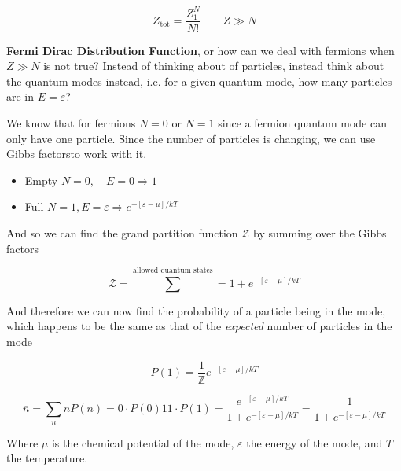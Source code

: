\documentclass[10pt]{article}
\begin{document}
\begin{equation}
	Z_\text{tot}  = \frac{Z_1^N}{N!} \qquad Z \gg N
	\label{eq:294:partition_fn_tot_indistinguishable_final}
\end{equation}


\begin{definition}
	\textbf{Fermi Dirac Distribution Function}, or how can we deal with fermions when $ Z\gg N $ is not true?
	Instead of thinking about of particles, instead think about the quantum modes instead, i.e. for a given quantum mode, how many particles are in $ E = \varepsilon $?

	We know that for fermions $ N = 0$  or $ N = 1$ since a fermion quantum mode can only have one particle. 
	Since the number of particles is changing, we can use Gibbs factorsto work with it. 

	\begin{itemize}
		\item Empty $ N = 0, \quad E = 0 \Rightarrow 1$  
		\item Full $ N = 1, E = \varepsilon \Rightarrow e^{-[\varepsilon - \mu] /kT} $ 
	\end{itemize}

	And so we can find the grand partition function $ \mathcal{Z} $  by summing over the Gibbs factors

	\begin{equation}
		\mathcal{Z} = \sum^\text{allowed quantum states}  = 1 + e^{-[\varepsilon - \mu] /kT}
	\end{equation}

	And therefore we can now find the probability of a particle being in the mode, which happens to be the same as that of the \textit{expected} number of particles in the mode

\begin{equation}
	P(1) = \frac{1}{\mathbb{Z}} e^{-[\varepsilon - \mu] /kT}
	\end{equation}
	
	\begin{equation}
		\overline{n} = \sum_n nP(n) = 0 \cdot  P(0) 1 1 \cdot P(1) =   \frac{e^{-[\varepsilon - \mu] /kT}}{1 +e^{-[\varepsilon - \mu] /kT}} = \frac{1}{1 +e^{-[\varepsilon - \mu] /kT}}
	\end{equation}

	Where $ \mu $ is the chemical potential of the mode, $ \varepsilon $ the energy of the mode, and $ T $ the temperature.


\end{definition}
\end{document}
